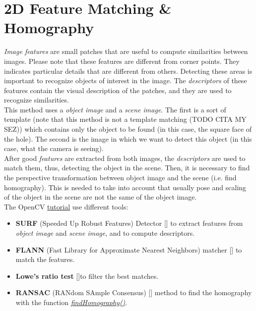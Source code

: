 \section{2D Feature Matching \& Homography}

\textit{Image features} are small patches that are useful to compute similarities between images. Please note that these features are different from corner points.
They indicates particular details that are different from others. Detecting these areas is important to recognize objects of interest in the image. The \textit{descriptors} of these features contain the visual description of the patches, and they are used to recognize similarities.\\
This method uses a \textit{object image} and a \textit{scene image}. The first is a sort of template (note that this method is not a template matching (TODO CITA MY SEZ)) %
which contains only the object to be found (in this case, the square face of the hole). The second is the image in which we want to detect this object (in this case, what the camera is seeing).\\
After good \textit{features} are extracted from both images, the \textit{descriptors} are used to match them, thus, detecting the object in the scene.
Then, it is necessary to find the perspective transformation between object image and the scene (i.e. find homography). This is needed to take into account that usually pose and scaling of the object in the scene are not the same of the object image.\\
The OpenCV \href{https://docs.opencv.org/3.4/d7/dff/tutorial_feature_homography.html}{tutorial} use different tools:
\begin{itemize}
	\item \textbf{SURF} (Speeded Up Robust Features) Detector [\cite{surfDet}] to extract features from \textit{object image} and \textit{scene image}, and to compute descriptors.
	\item \textbf{FLANN} (Fast Library for Approximate Nearest Neighbors) matcher [\cite{flannMatch}] to match the features.
	\item \textbf{Lowe's ratio test} [\cite{loweTest}]to filter the best matches.
	\item \textbf{RANSAC} (RANdom SAmple Consensus) [\cite{ransacHomog}] method to find the homography with the function \href{https://docs.opencv.org/3.4/d9/d0c/group__calib3d.html#ga4abc2ece9fab9398f2e560d53c8c9780}{\textit{findHomography()}}.
\end{itemize}
